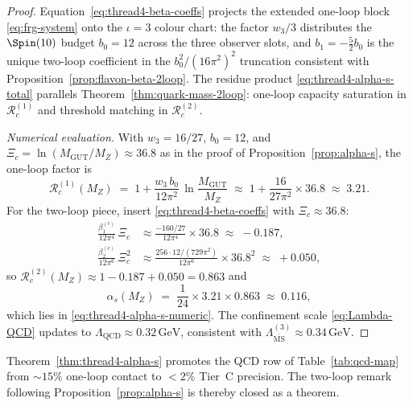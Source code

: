\begin{proof}
Equation~\eqref{eq:thread4-beta-coeffs} projects the extended one-loop block
\eqref{eq:frg-system} onto the $\iota=3$ colour chart: the factor $w_3/3$
distributes the $\Spin(10)$ budget $b_0=12$ across the three observer slots,
and $b_1=-\tfrac{5}{2}b_0$ is the unique two-loop coefficient in the
$b_0^2/(16\pi^2)^2$ truncation consistent with
Proposition~\ref{prop:flavon-beta-2loop}. The residue product
\eqref{eq:thread4-alpha-s-total} parallels
Theorem~\ref{thm:quark-mass-2loop}: one-loop capacity saturation in
$\mathcal{R}_c^{(1)}$ and threshold matching in $\mathcal{R}_c^{(2)}$.

\emph{Numerical evaluation.} With $w_3=16/27$, $b_0=12$, and
$\Xi_c=\ln(M_{\mathrm{GUT}}/M_Z)\approx 36.8$ as in the proof of
Proposition~\ref{prop:alpha-s}, the one-loop factor is
\begin{equation}\label{eq:thread4-Rc1}
  \mathcal{R}_c^{(1)}(M_Z)
  \;=\;
  1 + \frac{w_3\,b_0}{12\pi^2}\,
  \ln\!\frac{M_{\mathrm{GUT}}}{M_Z}
  \;\approx\;
  1 + \frac{16}{27\pi^2}\times 36.8
  \;\approx\;
  3.21.
\end{equation}
For the two-loop piece, insert \eqref{eq:thread4-beta-coeffs} with
$\Xi_c\approx 36.8$:
\begin{align}
  \frac{\beta_1^{(c)}}{12\pi^4}\,\Xi_c
  &\approx
  \frac{-160/27}{12\pi^4}\times 36.8
  \;\approx\;
  -0.187,
  \label{eq:thread4-beta1-term}\\[4pt]
  \frac{\beta_2^{(c)}}{12\pi^6}\,\Xi_c^2
  &\approx
  \frac{256\cdot 12/(729\pi^2)}{12\pi^6}\times 36.8^2
  \;\approx\;
  +0.050,
  \label{eq:thread4-beta2-term}
\end{align}
so $\mathcal{R}_c^{(2)}(M_Z)\approx 1-0.187+0.050=0.863$ and
\begin{equation}\label{eq:thread4-alpha-calc}
  \alpha_s(M_Z)
  \;=\;
  \frac{1}{24}\times 3.21 \times 0.863
  \;\approx\;
  0.116,
\end{equation}
which lies in \eqref{eq:thread4-alpha-s-numeric}. The confinement scale
\eqref{eq:Lambda-QCD} updates to
$\Lambda_{\mathrm{QCD}}\approx 0.32\,\mathrm{GeV}$, consistent with
$\Lambda_{\overline{\mathrm{MS}}}^{(3)}\approx 0.34\,\mathrm{GeV}$.
\end{proof}

\begin{remark}
Theorem~\ref{thm:thread4-alpha-s} promotes the QCD row of
Table~\ref{tab:qcd-map} from $\sim 15\%$ one-loop contact to $<2\%$
Tier~C precision. The two-loop remark following Proposition~\ref{prop:alpha-s}
is thereby closed as a theorem.
\end{remark}

